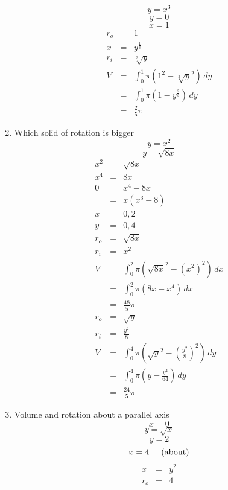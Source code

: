 \documentclass{article}
\begin{document}
\begin{enumerate}
        $$y = x^3$$
        $$y = 0$$
        $$x = 1$$
        \begin{eqnarray}
            r_o &=& 1 \\
            x &=& y^{\frac{1}{3}} \\
            r_i &=& \sqrt[3]{y} \\
            V &=& \int_0^1{\pi\left(1^2 - \sqrt[3]{y}^2\right)\,dy} \\
              &=& \int_0^1{\pi\left(1 - y^{\frac{2}{3}}\right)\,dy} \\
              &=& \frac{2}{5}\pi
        \end{eqnarray}
    \item Which solid of rotation is bigger
        $$y = x^2$$
        $$y = \sqrt{8x}$$
        \begin{eqnarray}
            x^2 &=& \sqrt{8x} \\
            x^4 &=& 8x \\
            0 &=& x^4 - 8x \\
              &=& x\left(x^3 - 8\right) \\
            x &=& 0, 2 \\
            y &=& 0, 4 \\
            r_o &=& \sqrt{8x} \\
            r_i &=& x^2 \\
            V &=& \int_0^2{\pi\left(\sqrt{8x}^2 - \left(x^2\right)^2\right)\,dx} \\
              &=& \int_0^2{\pi\left(8x - x^4\right)\,dx} \\
              &=& \frac{48}{5}\pi \\
            r_o &=& \sqrt{y} \\
            r_i &=& \frac{y^2}{8} \\
            V &=& \int_0^4{\pi\left(\sqrt{y}^2 - \left(\frac{y^2}{8}\right)^2\right)\,dy} \\
              &=& \int_0^4{\pi\left(y - \frac{y^4}{64}\right)\,dy} \\
              &=& \frac{24}{5}\pi
        \end{eqnarray}
    \item Volume and rotation about a parallel axis
        $$x = 0$$
        $$y = \sqrt{x}$$
        $$y = 2$$
        $$x = 4 \hspace{0.5cm} \text{(about)}$$
        \begin{eqnarray}
            x &=& y^2 \\
            r_o &=& 4 \\

\end{eqnarray}
\end{enumerate}
\end{document}
